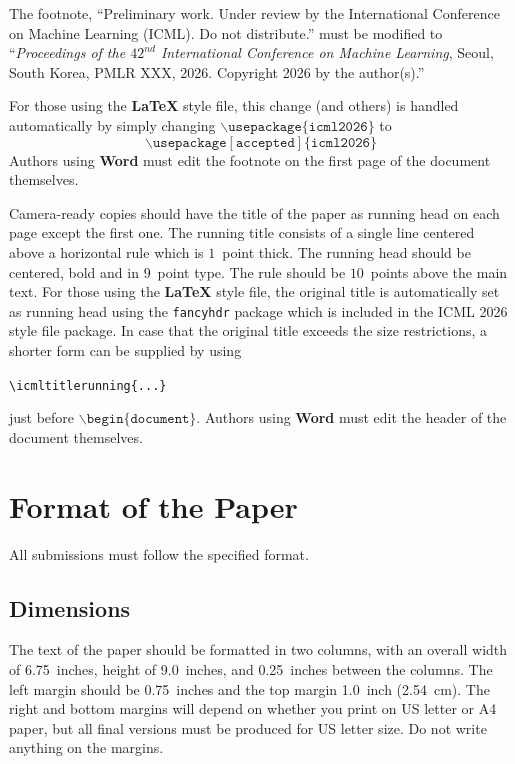 \documentclass{article}
\theoremstyle{plain}
\theoremstyle{definition}
\theoremstyle{remark}
\begin{document}
The footnote, ``Preliminary work. Under review by the International
Conference on Machine Learning (ICML). Do not distribute.'' must be
modified to ``\textit{Proceedings of the
  $\mathit{42}^{nd}$ International Conference on Machine Learning},
Seoul, South Korea, PMLR XXX, 2026.
Copyright 2026 by the author(s).''

For those using the \textbf{\LaTeX} style file, this change (and others) is
handled automatically by simply changing
$\mathtt{\backslash usepackage\{icml2026\}}$ to
$$\mathtt{\backslash usepackage[accepted]\{icml2026\}}$$
Authors using \textbf{Word} must edit the
footnote on the first page of the document themselves.

Camera-ready copies should have the title of the paper as running head
on each page except the first one. The running title consists of a
single line centered above a horizontal rule which is $1$~point thick.
The running head should be centered, bold and in $9$~point type. The
rule should be $10$~points above the main text. For those using the
\textbf{\LaTeX} style file, the original title is automatically set as running
head using the \texttt{fancyhdr} package which is included in the ICML
2026 style file package. In case that the original title exceeds the
size restrictions, a shorter form can be supplied by using

\verb|\icmltitlerunning{...}|

just before $\mathtt{\backslash begin\{document\}}$.
Authors using \textbf{Word} must edit the header of the document themselves.

\section{Format of the Paper}

All submissions must follow the specified format.

\subsection{Dimensions}

The text of the paper should be formatted in two columns, with an
overall width of 6.75~inches, height of 9.0~inches, and 0.25~inches
between the columns. The left margin should be 0.75~inches and the top
margin 1.0~inch (2.54~cm). The right and bottom margins will depend on
whether you print on US letter or A4 paper, but all final versions
must be produced for US letter size.
Do not write anything on the margins.
\end{document}
